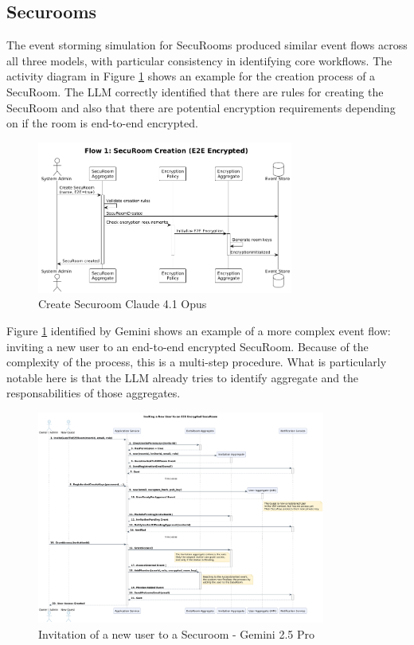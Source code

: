 \subsection{Securooms}
The event storming simulation for SecuRooms produced similar event flows across all three models, with particular consistency in identifying core workflows. The activity diagram in Figure \ref{fig:event-create-securoom-claude} shows an example for the creation process of a SecuRoom. The LLM correctly identified that there are rules for creating the SecuRoom and also that there are potential encryption requirements depending on if the room is end-to-end encrypted.

\begin{figure}[H]
    \centering
    \includegraphics[height=5cm]{figures/create-securoom-claude.png} 
    \caption{Create Securoom Claude 4.1 Opus}
    \label{fig:event-create-securoom-claude} 
  \end{figure}

Figure \ref{fig:event-create-securoom-claude} identified by Gemini shows an example of a more complex event flow: inviting a new user to an end-to-end encrypted SecuRoom. Because of the complexity of the process, this is a multi-step procedure. What is particularly notable here is that the LLM already tries to identify aggregate and the responsabilities of those aggregates.

\begin{figure}[H]
    \centering
    \includegraphics[height=7cm]{figures/invitaion-new-user-gemini.png} 
    \caption{Invitation of a new user to a Securoom - Gemini 2.5 Pro}
    \label{fig:event-invite-new-user-gemini} 
  \end{figure}

